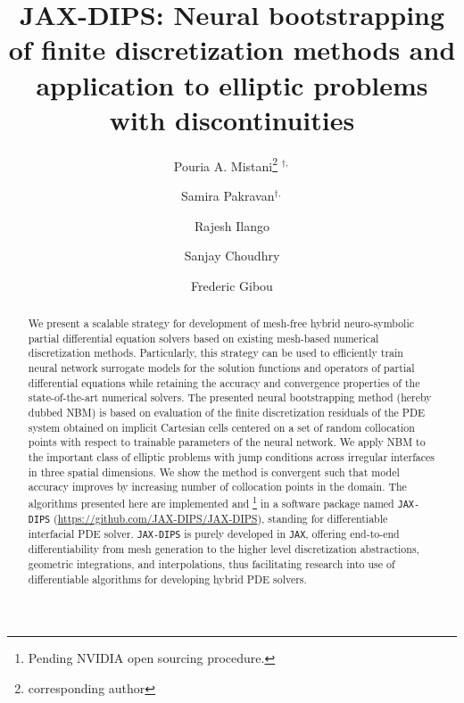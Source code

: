 \documentclass{elsarticle}
\begin{document}

\title{JAX-DIPS: Neural bootstrapping of finite discretization methods and application to elliptic problems with discontinuities}




\author[1]{Pouria A. Mistani\thanks{corresponding author} $^{\dagger,}$}
\author[2]{Samira Pakravan$^{\dagger,}$}
\author[1]{Rajesh Ilango}
\author[1]{Sanjay Choudhry}
\author[2]{Frederic Gibou}

\address[1]{NVIDIA Corporation, Santa Clara, CA 95051, USA}
\address[2]{University of California, Santa Barbara, CA 93106-5070, USA}

\begin{abstract}
	We present a scalable strategy for development of mesh-free hybrid neuro-symbolic partial differential equation solvers based on existing mesh-based numerical discretization methods. Particularly, this strategy can be used to efficiently train neural network surrogate models for the solution functions and operators of partial differential equations while retaining the accuracy and convergence properties of the state-of-the-art numerical solvers. The presented neural bootstrapping method (hereby dubbed NBM) is based on evaluation of the finite discretization residuals of the PDE system obtained on implicit Cartesian cells centered on a set of random collocation points with respect to trainable parameters of the neural network. We apply NBM to the important class of elliptic problems with jump conditions across irregular interfaces in three spatial dimensions. We show the method is convergent such that model accuracy improves by increasing number of collocation points in the domain.  The algorithms presented here are implemented and \footnote{Pending NVIDIA open sourcing procedure.} in a software package named \texttt{JAX-DIPS} (\href{https://github.com/JAX-DIPS/JAX-DIPS}{https://github.com/JAX-DIPS/JAX-DIPS}), standing for differentiable interfacial PDE solver. \texttt{JAX-DIPS} is purely developed in \texttt{JAX}, offering end-to-end differentiability from mesh generation to the higher level discretization abstractions, geometric integrations, and interpolations, thus facilitating research into use of differentiable algorithms for developing hybrid PDE solvers.

\end{abstract}
\end{document}
